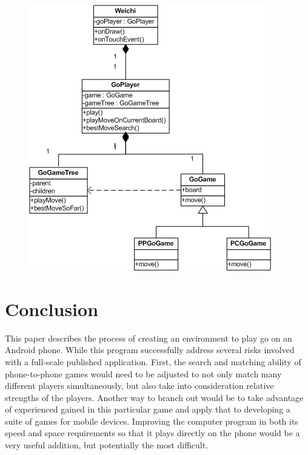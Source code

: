 \documentclass[acmtocl]{acmtrans2m}
\begin{document}
\begin{figure}[t]
 \centering
 \includegraphics[width = \linewidth]{fig/class}
 \label{fig:class}
\end{figure}


\section{Conclusion}
This paper describes the process of creating an environment to play go on an Android phone.  While this program successfully address several risks involved with a full-scale published application.  First, the search and matching ability of phone-to-phone games would need to be adjusted to not only match many different players simultaneously, but also take into consideration relative strengths of the players.   Another way to branch out would be to take advantage of experienced gained in this particular game and apply that to developing a suite of games for mobile devices.   Improving the computer program in both its speed and space requirements so that it plays directly on the phone would be a very useful addition, but potentially the most difficult. 
\end{document}
